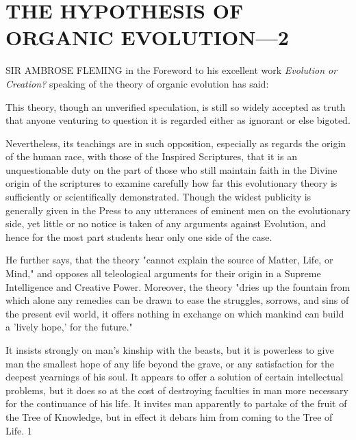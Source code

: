 \chapter{THE HYPOTHESIS OF ORGANIC EVOLUTION—2}

SIR AMBROSE FLEMING in the Foreword to his excellent work \textit{Evolution or Creation?}
speaking of the theory of organic evolution has said:

This theory, though an unverified speculation, is still so widely accepted as truth that anyone
venturing to question it is regarded either as ignorant or else bigoted.

Nevertheless, its teachings are in such opposition, especially as regards the origin of the
human race, with those of the Inspired Scriptures, that it is an unquestionable duty on the part
of those who still maintain faith in the Divine origin of the scriptures to examine carefully
how far this evolutionary theory is sufficiently or scientifically demonstrated. Though the
widest publicity is generally given in the Press to any utterances of eminent men on the
evolutionary side, yet little or no notice is taken of any arguments against Evolution, and
hence for the most part students hear only one side of the case.

He further says, that the theory "cannot explain the source of Matter, Life, or Mind," and
opposes all teleological arguments for their origin in a Supreme Intelligence and Creative
Power. Moreover, the theory "dries up the fountain from which alone any remedies can be
drawn to ease the struggles, sorrows, and sins of the present evil world, it offers nothing in
exchange on which mankind can build a 'lively hope,' for the future."

It insists strongly on man's kinship with the beasts, but it is powerless to give man the
smallest hope of any life beyond the grave, or any satisfaction for the deepest yearnings of
his soul. It appears to offer a solution of certain intellectual problems, but it does so at the
cost of destroying faculties in man more necessary for the continuance of his life. It invites
man apparently to partake of the fruit of the Tree of Knowledge, but in effect it debars him
from coming to the Tree of Life. 1


